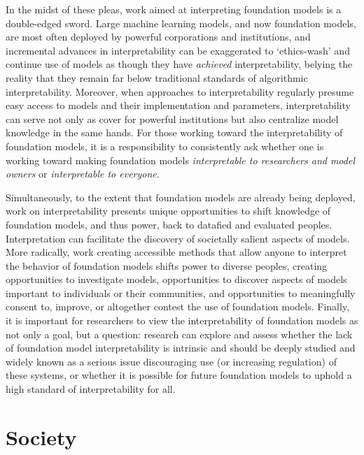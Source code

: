 In the midst of these pleas, work aimed at interpreting foundation models is a double-edged sword. Large machine learning models, and now foundation models, are most often deployed by powerful corporations and institutions, and incremental advances in interpretability can be exaggerated to `ethics-wash' and continue use of models as though they have \textit{achieved} interpretability, belying the reality that they remain far below traditional standards of algorithmic interpretability. Moreover, when approaches to interpretability regularly presume easy access to models and their implementation and parameters, interpretability can serve not only as cover for powerful institutions but also centralize model knowledge in the same hands. For those working toward the interpretability of foundation models, it is a responsibility to consistently ask whether one is working toward making foundation models \textit{interpretable to researchers and model owners} or \textit{interpretable to everyone}. 

Simultaneously, to the extent that foundation models are already being deployed, work on interpretability presents unique opportunities to shift knowledge of foundation models, and thus power, back to datafied and evaluated peoples. Interpretation can facilitate the discovery of societally salient aspects of models. More radically, work creating accessible methods that allow anyone to interpret the behavior of foundation models shifts power to diverse peoples, creating opportunities to investigate models, opportunities to discover aspects of models important to individuals or their communities, and opportunities to meaningfully consent to, improve, or altogether contest the use of foundation models. Finally, it is important for researchers to view the interpretability of foundation models as not only a goal, but a question: research can explore and assess whether the lack of foundation model interpretability is intrinsic and should be deeply studied and widely known as a serious issue discouraging use (or increasing regulation) of these systems, or whether it is possible for future foundation models to uphold a high standard of interpretability for all. 

\section{Society}
\label{sec:society}

